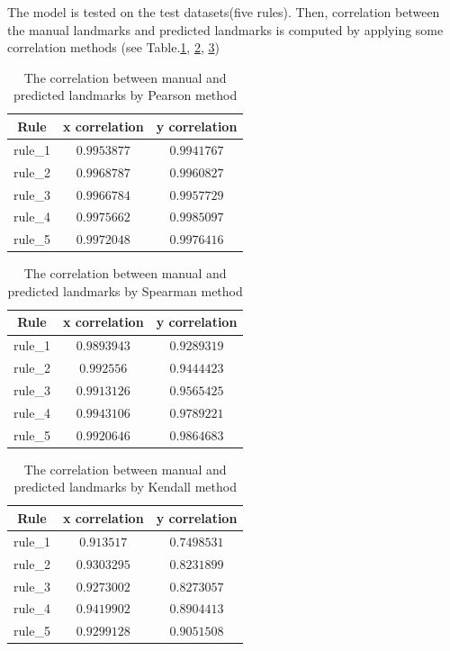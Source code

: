 \documentclass[12pt,a4paper]{article}
\begin{document}
The model is tested on the test datasets(five rules). Then, correlation between the manual landmarks and predicted landmarks is computed by applying some correlation methods (see Table.\ref{pearson}, \ref{spearman}, \ref{kendall})
\begin{table}[h!]
	\centering
	\begin{tabular}{c c c}
		Rule & x correlation & y correlation \\ \hline
		rule\_1 & $0.9953877$ & $0.9941767$ \\ \hline
		rule\_2 & $0.9968787$ & $0.9960827$ \\ \hline
		rule\_3 & $0.9966784$ & $0.9957729$ \\ \hline
		rule\_4 & $0.9975662$ & $0.9985097$ \\ \hline
		rule\_5 & $0.9972048$ & $0.9976416$ \\ \hline
	\end{tabular}
	\caption{The correlation between manual and predicted landmarks by Pearson\cite{pallant2013spss} method}
	\label{pearson}
\end{table}
\begin{table}[h!]
	\centering
	\begin{tabular}{c c c}
		Rule & x correlation & y correlation \\ \hline
		rule\_1 & $0.9893943$ & $0.9289319$ \\ \hline
		rule\_2 & $0.992556$ & $0.9444423$ \\ \hline
		rule\_3 & $0.9913126$ & $0.9565425$ \\ \hline
		rule\_4 & $0.9943106$ & $0.9789221$ \\ \hline
		rule\_5 & $0.9920646$ & $0.9864683$ \\ \hline
	\end{tabular}
	\caption{The correlation between manual and predicted landmarks by Spearman\cite{myers2010research} method}
	\label{spearman}
\end{table}
\begin{table}[h!]
	\centering
	\begin{tabular}{c c c}
		Rule & x correlation & y correlation \\ \hline
		rule\_1 & $0.913517$ & $0.7498531$ \\ \hline
		rule\_2 & $0.9303295$ & $0.8231899$ \\ \hline
		rule\_3 & $0.9273002$ & $0.8273057$ \\ \hline
		rule\_4 & $0.9419902$ & $0.8904413$ \\ \hline
		rule\_5 & $0.9299128$ & $0.9051508$ \\ \hline
	\end{tabular}
	\caption{The correlation between manual and predicted landmarks by Kendall\cite{kendall1938new} method}
	\label{kendall}
\end{table}
\end{document}
